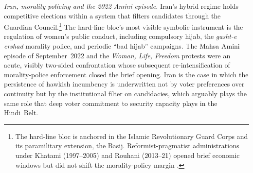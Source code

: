 \emph{Iran, morality policing and the 2022 Amini episode.} Iran's hybrid
regime holds competitive elections within a system that filters candidates
through the Guardian Council.\footnote{The hard-line bloc is anchored in
the Islamic Revolutionary Guard Corps and its paramilitary extension, the
Basij. Reformist-pragmatist administrations under Khatami (1997--2005) and
Rouhani (2013--21) opened brief economic windows but did not shift the
morality-policy margin \citep*{keshavarzianBazaarStateIran2007,kurzmanUnthinkableRevolutionIran2004}.} The hard-line bloc's most visible symbolic
instrument is the regulation of women's public conduct, including compulsory
hijab, the \emph{gasht-e ershad} morality police, and periodic ``bad
hijab'' campaigns. The Mahsa Amini episode of September~2022 and the
\emph{Woman, Life, Freedom} protests were an acute, visibly two-sided
confrontation whose subsequent re-intensification of morality-police
enforcement closed the brief opening. Iran is the case in which the
persistence of hawkish incumbency is underwritten not by voter preferences
over continuity but by the institutional filter on candidacies, which
arguably plays the same role that deep voter commitment to security
capacity plays in the Hindi~Belt.


